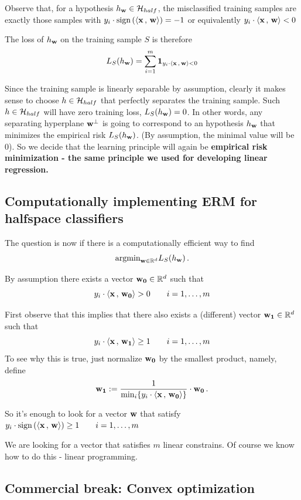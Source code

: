 Observe that, for a hypothesis $  h_{\mathbf{w}} \in \mathcal{H}_{half}$,  the misclassified
training 
samples are exactly those samples with 
$y_i \cdot \text{sign}\left( {\left\langle \mathbf{x}\,,\,\mathbf{w} \right\rangle}\right) = -1$ or equivalently 
$y_i \cdot {\left\langle \mathbf{x}\,,\,\mathbf{w} \right\rangle}  <0$

The loss of $ h_{\mathbf{w}}$ on the training sample $S$ is therefore
\[
  L_S( h_{\mathbf{w}}) = \sum_{i=1}^m \mathbf{1}_{y_i \cdot 
  {\left\langle \mathbf{x}\,,\,\mathbf{w} \right\rangle} <0}
\]

Since the training
sample is linearly separable by assumption, clearly it makes sense to choose $h\in\mathcal{H}_{half}$ 
that perfectly separates the training sample. Such $h\in\mathcal{H}_{half}$ will have
zero training loss, $ L_S( h_{\mathbf{w}}) =0$.
In other words, any separating hyperplane $\mathbf{w}^\perp$ is going
to correspond to an hypothesis $h_{\mathbf{w}}$ that minimizes the empirical risk 
$  L_S( h_{\mathbf{w}})$. (By assumption, the minimal value will be $0$).
So we decide that the learning principle will again be {\bf
empirical risk minimization -  the same principle we used for developing
linear regression.} 

\subsection{Computationally implementing ERM for halfspace classifiers}

The question is now if there is a computationally efficient way to find
\[  \text{argmin}_{\mathbf{w}\in\mathbb{R}^d} L_S(h_{\mathbf{w}})\,.\]

By assumption there exists a vector $\mathbf{w_0}\in\mathbb{R}^d$ such that
\[
y_i \cdot {\left\langle \mathbf{x}\,,\,\mathbf{w_0} \right\rangle}  > 0\qquad 
i=1,\ldots,m
\]

First observe that this implies that there also exists a (different) vector
 $\mathbf{w_1}\in\mathbb{R}^d$ such that
 \[
y_i \cdot {\left\langle \mathbf{x}\,,\,\mathbf{w_1} \right\rangle}  \geq 1 \qquad 
i=1,\ldots,m
\]
To see why this is true, just normalize $\mathbf{w_0}$ by the smallest product,
namely, define 
\[
  \mathbf{w_1} := \frac{1}{ \min_i \{y_i \cdot 
  {\left\langle \mathbf{x}\,,\,\mathbf{w_0} \right\rangle} \}  }\cdot \mathbf{w_0}\,.
\]

So it's enough to look for a vector $\mathbf{w}$ that satisfy
 $
y_i \cdot \text{sign}\left( {\left\langle \mathbf{x}\,,\,\mathbf{w} \right\rangle} \right) \geq 1 \qquad 
i=1,\ldots,m
$

We are looking for a vector that  satisfies $m$ linear constrains. Of course we
know how to do this - linear programming.

\subsection{Commercial break: Convex optimization}

